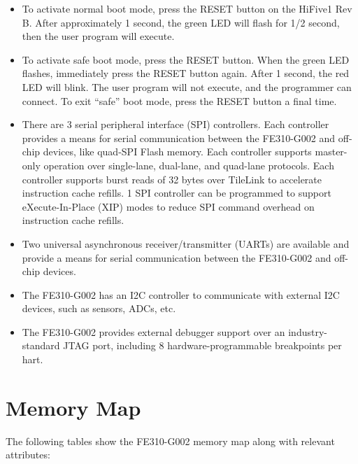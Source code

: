 \documentclass[a4paper,12pt,twoside]{report}
\begin{document}
\begin{itemize}
            	\item To activate normal boot mode, press the RESET button on the HiFive1 Rev B. After approximately 1 second, the green LED will flash for 1/2 second, then the user program will execute.\cite{hifive1RevBBootLoader}

                \item To activate safe boot mode, press the RESET button. When the green LED flashes, immediately press the RESET button again. After 1 second, the red LED will blink. The user program will not execute, and the programmer can connect. To exit “safe” boot mode, press the RESET button a final time.\cite{hifive1RevBBootLoader}

                \item There are 3 serial peripheral interface (SPI) controllers. Each controller provides a means for serial communication between the FE310-G002 and off-chip devices, like quad-SPI Flash memory. Each controller supports master-only operation over single-lane, dual-lane, and quad-lane protocols. Each controller supports burst reads of 32 bytes over TileLink to accelerate instruction cache refills. 1 SPI controller can be programmed to support eXecute-In-Place (XIP) modes to reduce SPI command overhead on instruction cache refills.\cite{fe310g002manOverview}

                \item Two universal asynchronous receiver/transmitter (UARTs) are available and provide a means for serial communication between the FE310-G002 and off-chip devices.\cite{fe310g002manOverview}

                \item The FE310-G002 has an I2C controller to communicate with external I2C devices, such as sensors, ADCs, etc.\cite{fe310g002manOverview}

                \item The FE310-G002 provides external debugger support over an industry-standard JTAG port, including 8 hardware-programmable breakpoints per hart.\cite{fe310g002manOverview}
            \end{itemize}

            \section{Memory Map}
            	The following tables show the FE310-G002 memory map along with relevant attributes:\cite{fe310g002manMMap}
\end{document}
